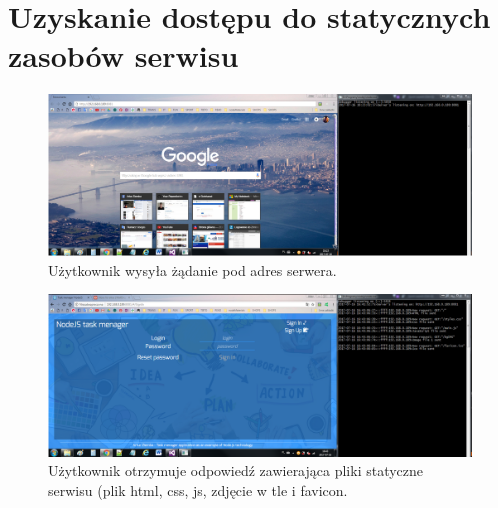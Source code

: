 \documentclass[12pt]{report}
\begin{document}
\section{Uzyskanie dostępu do statycznych zasobów serwisu}
\begin{figure}[h]
\centering
\includegraphics[width=\textwidth,height=\textheight,keepaspectratio]{11.png}
\captionsetup{labelformat=empty}
\caption[]{Użytkownik wysyła żądanie pod adres serwera.}
\end{figure}
\begin{figure}[h]
\centering
\includegraphics[width=\textwidth,height=\textheight,keepaspectratio]{12.png}
\captionsetup{labelformat=empty}
\caption[]{Użytkownik otrzymuje odpowiedź zawierająca pliki statyczne serwisu (plik html, css, js, zdjęcie w tle i favicon.}
\end{figure}
\end{document}
